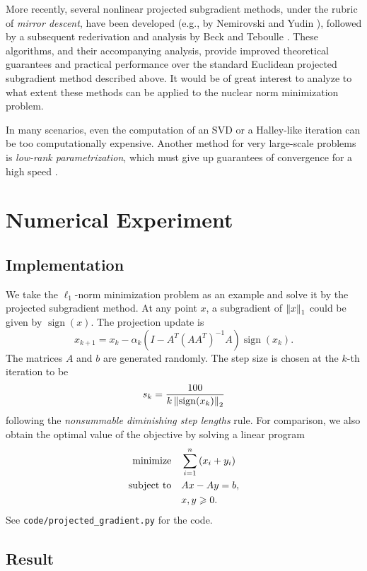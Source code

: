 \documentclass[11pt]{article}
\begin{document}
More recently, several nonlinear projected subgradient methods, under the rubric of \emph{mirror descent}, have been developed (e.g., by Nemirovski and Yudin \cite{blair1985problem}), followed by a subsequent rederivation and analysis by Beck and Teboulle \cite{beck2003mirror}. These algorithms, and their accompanying analysis, provide improved theoretical guarantees and practical performance over the standard Euclidean projected subgradient method described above. It would be of great interest to analyze to what extent these methods can be applied to the nuclear norm minimization problem.

In many scenarios, even the computation of an SVD or a Halley-like iteration can be too computationally expensive. Another method for  very large-scale problems is \emph{low-rank parametrization}, which  must give up guarantees of convergence for a high speed \cite{recht2010guaranteed}.

\section{Numerical Experiment}

\subsection{Implementation}

We take the \(\ell_1\)-norm minimization problem as an example and solve it by the projected subgradient method. At any point \(x\), a subgradient of \(\left\|x\right\|_1\) could be given by \(\operatorname{sign}(x)\). The projection update is
\[x_{k+1}=x_k-\alpha_k\left(I-A^T\left(AA^T\right)^{-1}A\right)\operatorname{sign}\left(x_k\right).\]
The matrices \(A\) and \(b\) are generated randomly. The step size is chosen at the \(k\)-th iteration to be
\[s_k=\frac{100}{k\left\|\operatorname{sign}(x_k)\right\|_2}\]
following the \emph{nonsummable diminishing step lengths} rule. For comparison, we also obtain the optimal value of the objective by solving a linear program
\[\begin{aligned}
    \textnormal{minimize}\quad & \sum_{i=1}^n\left(x_i+y_i\right)\\
    \textnormal{subject to}\quad & Ax-Ay=b,\\
    & x,y\geqslant 0.
\end{aligned}\]
See \texttt{code/projected\_gradient.py} for the code.

\subsection{Result}
\end{document}
